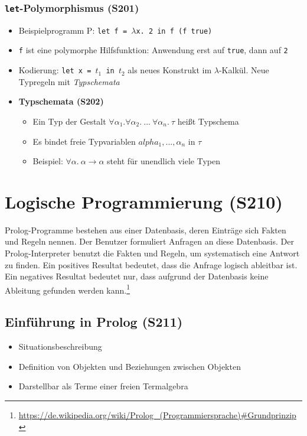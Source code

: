 \subsubsection{\texttt{let}-Polymorphismus (S201)}
\begin{itemize}
	\item Beispielprogramm P: \texttt{let f = \(\lambda\)x. 2 in f (f true)}
	\item \texttt{f} ist eine polymorphe Hilfsfunktion: Anwendung erst auf \texttt{true}, dann auf \texttt{2}
	\item Kodierung: \texttt{let x = \(t_1\) in \(t_2\)} als neues Konstrukt im \(\lambda\)-Kalkül. Neue Typregeln mit \textit{Typschemata}
	\item \textbf{Typschemata (S202)}
	\begin{itemize}
		\item Ein Typ der Gestalt \(\forall\alpha_1.\forall\alpha_2.~...~\forall\alpha_n.~\tau\) heißt Typschema
		\item Es bindet freie Typvariablen \(alpha_1,...,\alpha_n\) in \(\tau\)
		\item Beispiel: \(\forall\alpha.~\alpha\rightarrow\alpha\) steht für unendlich viele Typen
	\end{itemize}
\end{itemize}


\section{Logische Programmierung (S210)}
Prolog-Programme bestehen aus einer Datenbasis, deren Einträge sich Fakten und Regeln nennen. Der Benutzer formuliert Anfragen an diese Datenbasis. Der Prolog-Interpreter benutzt die Fakten und Regeln, um systematisch eine Antwort zu finden. Ein positives Resultat bedeutet, dass die Anfrage logisch ableitbar ist. Ein negatives Resultat bedeutet nur, dass aufgrund der Datenbasis keine Ableitung gefunden werden kann.\footnote{\url{https://de.wikipedia.org/wiki/Prolog_(Programmiersprache)\#Grundprinzip}}

\subsection{Einführung in Prolog (S211)}
\begin{itemize}
	\item Situationsbeschreibung
	\item Definition von Objekten und Beziehungen zwischen Objekten
	\item Darstellbar als Terme einer freien Termalgebra
\end{itemize}

